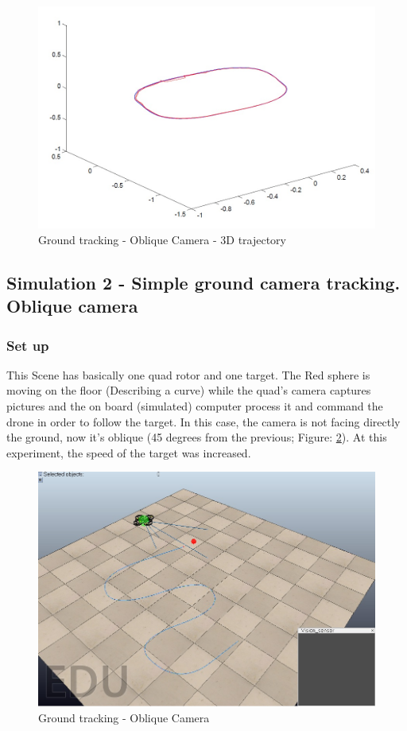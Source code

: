 \begin{figure}[ht]
\centering
\includegraphics[width=0.7\linewidth]{../Images/c3/sim1_traj_both_3d}
\caption{Ground tracking - Oblique Camera - 3D trajectory}
\label{fig:sim1_traj_both_3d}
\end{figure}




\subsection{Simulation 2 - Simple ground camera tracking. Oblique camera}
\subsubsection{Set up}
This Scene has basically one quad rotor and one target. The Red sphere is moving on the floor (Describing a curve) while the quad's camera captures pictures and the on board (simulated) computer process it and command the drone in order to follow the target. In this case, the camera is not facing directly the ground, now it's oblique (45 degrees from the previous; Figure: \ref{fig:ground_tracking_scene_oblique}). At this experiment, the speed of the target was increased.

\begin{figure}[h]
	\centering
	\includegraphics[width=0.7\linewidth]{../Images/c3/ground_tracking_scene_oblique}
	\caption{Ground tracking - Oblique Camera}
	\label{fig:ground_tracking_scene_oblique}
\end{figure}

